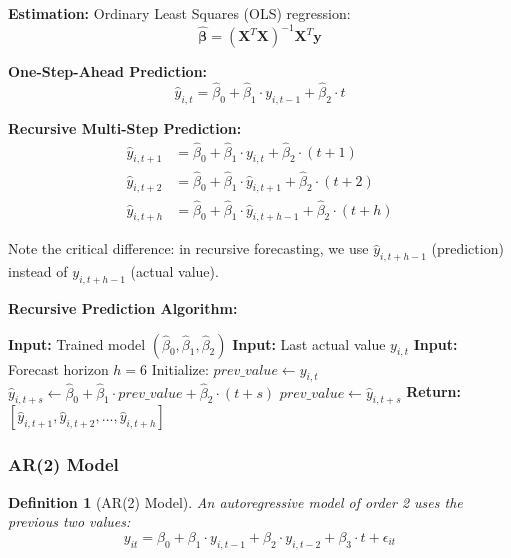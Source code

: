 \documentclass[12pt,a4paper]{article}
\newtheorem{definition}{Definition}[section]
\begin{document}
\textbf{Estimation:}
Ordinary Least Squares (OLS) regression:
\begin{equation}
\hat{\boldsymbol{\beta}} = (\mathbf{X}^T\mathbf{X})^{-1}\mathbf{X}^T\mathbf{y}
\end{equation}

\textbf{One-Step-Ahead Prediction:}
\begin{equation}
\hat{y}_{i,t} = \hat{\beta}_0 + \hat{\beta}_1 \cdot y_{i,t-1} + \hat{\beta}_2 \cdot t
\end{equation}

\textbf{Recursive Multi-Step Prediction:}
\begin{align}
\hat{y}_{i,t+1} &= \hat{\beta}_0 + \hat{\beta}_1 \cdot y_{i,t} + \hat{\beta}_2 \cdot (t+1) \\
\hat{y}_{i,t+2} &= \hat{\beta}_0 + \hat{\beta}_1 \cdot \hat{y}_{i,t+1} + \hat{\beta}_2 \cdot (t+2) \\
\hat{y}_{i,t+h} &= \hat{\beta}_0 + \hat{\beta}_1 \cdot \hat{y}_{i,t+h-1} + \hat{\beta}_2 \cdot (t+h)
\end{align}

Note the critical difference: in recursive forecasting, we use $\hat{y}_{i,t+h-1}$ (prediction) instead of $y_{i,t+h-1}$ (actual value).

\textbf{Recursive Prediction Algorithm:}

\begin{algorithm}[H]
\caption{AR(1) Recursive Multi-Step Forecasting}
\begin{algorithmic}[1]
\State \textbf{Input:} Trained model $(\hat{\beta}_0, \hat{\beta}_1, \hat{\beta}_2)$
\State \textbf{Input:} Last actual value $y_{i,t}$
\State \textbf{Input:} Forecast horizon $h = 6$
\State Initialize: $prev\_value \gets y_{i,t}$
    \State $\hat{y}_{i,t+s} \gets \hat{\beta}_0 + \hat{\beta}_1 \cdot prev\_value + \hat{\beta}_2 \cdot (t+s)$
    \State $prev\_value \gets \hat{y}_{i,t+s}$ 
\EndFor
\State \textbf{Return:} $[\hat{y}_{i,t+1}, \hat{y}_{i,t+2}, \ldots, \hat{y}_{i,t+h}]$
\end{algorithmic}
\end{algorithm}

\subsubsection{AR(2) Model}

\begin{definition}[AR(2) Model]
An autoregressive model of order 2 uses the previous two values:
\begin{equation}
y_{it} = \beta_0 + \beta_1 \cdot y_{i,t-1} + \beta_2 \cdot y_{i,t-2} + \beta_3 \cdot t + \epsilon_{it}
\end{equation}
\end{definition}
\end{document}
